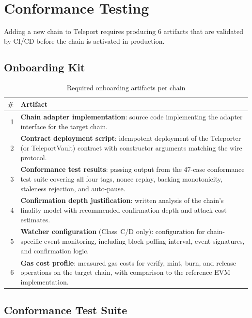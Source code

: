 \documentclass[11pt]{article}
\begin{document}
\section{Conformance Testing}
\label{sec:conformance}

Adding a new chain to Teleport requires producing 6 artifacts that are validated by CI/CD before the chain is activated in production.

\subsection{Onboarding Kit}

\begin{table}[H]
\centering
\begin{tabular}{rp{9cm}}
\toprule
\textbf{\#} & \textbf{Artifact} \\
\midrule
1 & \textbf{Chain adapter implementation}: source code implementing the adapter interface for the target chain. \\
2 & \textbf{Contract deployment script}: idempotent deployment of the Teleporter (or TeleportVault) contract with constructor arguments matching the wire protocol. \\
3 & \textbf{Conformance test results}: passing output from the 47-case conformance test suite covering all four tags, nonce replay, backing monotonicity, staleness rejection, and auto-pause. \\
4 & \textbf{Confirmation depth justification}: written analysis of the chain's finality model with recommended confirmation depth and attack cost estimates. \\
5 & \textbf{Watcher configuration} (Class~C/D only): configuration for chain-specific event monitoring, including block polling interval, event signatures, and confirmation logic. \\
6 & \textbf{Gas cost profile}: measured gas costs for verify, mint, burn, and release operations on the target chain, with comparison to the reference EVM implementation. \\
\bottomrule
\end{tabular}
\caption{Required onboarding artifacts per chain}
\label{tab:artifacts}
\end{table}

\subsection{Conformance Test Suite}
\end{document}
